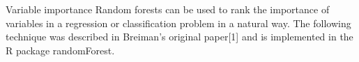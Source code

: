 Variable importance
Random forests can be used to rank the importance of variables in a regression or classification problem in a natural way. 
The following technique was described in Breiman's original paper[1] and is implemented in the R package randomForest.

